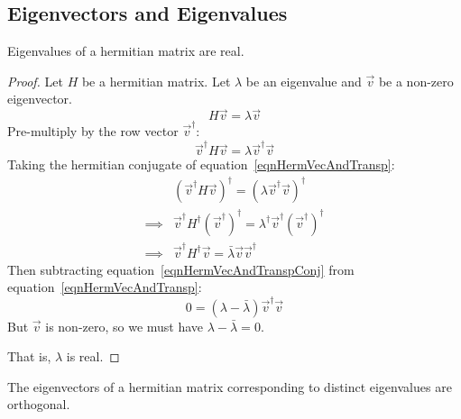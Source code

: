 \documentclass[../Main.tex]{subfiles}
\begin{document}
\subsection{Eigenvectors and Eigenvalues}
\begin{theorem}
    Eigenvalues of a hermitian matrix are real.
    \label{thmHermitianEVals}
\end{theorem}
\begin{proof}
    Let $H$ be a hermitian matrix. Let $\lambda$ be an eigenvalue and $\vec{v}$ be a non-zero eigenvector.
    \begin{equation*}
        H \vec{v} = \lambda \vec{v}
    \end{equation*}
    Pre-multiply by the row vector $\vec{v}^\dagger$:
    \begin{equation}
        \vec{v}^\dagger H \vec{v} = \lambda \vec{v}^\dagger \vec{v}
        \label{eqnHermVecAndTransp}
    \end{equation}
    Taking the hermitian conjugate of equation~\ref{eqnHermVecAndTransp}:
    \begin{align}
       & \left(\vec{v}^\dagger H \vec{v}\right)^\dagger = \left(\lambda \vec{v}^\dagger \vec{v}\right)^\dagger \nonumber \\
       \implies & \vec{v}^\dagger H^\dagger \left(\vec{v}^\dagger\right)^\dagger = \lambda^\dagger \vec{v}^\dagger \left(\vec{v}^\dagger\right)^\dagger \nonumber \\
       \implies & \vec{v}^\dagger H^\dagger \vec{v} = \bar{\lambda} \vec{v} \vec{v}^\dagger \label{eqnHermVecAndTranspConj}
    \end{align}
    Then subtracting equation~\ref{eqnHermVecAndTranspConj} from equation~\ref{eqnHermVecAndTransp}:
    \begin{equation*}
        0 = \left(\lambda - \bar{\lambda}\right)\vec{v}^\dagger \vec{v}
    \end{equation*}
    But $\vec{v}$ is non-zero, so we must have $\lambda - \bar{\lambda} = 0$.\par
    That is, $\lambda$ is real.
\end{proof}
\begin{theorem}
    The eigenvectors of a hermitian matrix corresponding to distinct eigenvalues are orthogonal.
    \label{thmHermitianEVecs}
\end{theorem}
\end{document}

